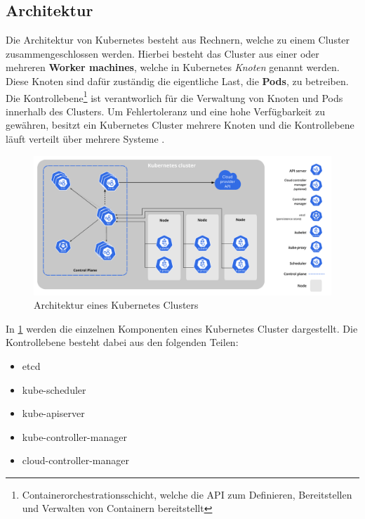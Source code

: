 \subsection{Architektur}
\label{subsec:kubernetes:architecture}
Die Architektur von Kubernetes besteht aus Rechnern, welche zu einem Cluster zusammengeschlossen werden.
Hierbei besteht das Cluster aus einer oder mehreren \textbf{Worker machines}, welche in Kubernetes \emph{Knoten}
genannt werden. Diese Knoten sind dafür zuständig die eigentliche Last, die \textbf{Pods}, zu betreiben.
Die Kontrollebene\footnote{Containerorchestrationsschicht, welche die API zum Definieren, Bereitstellen und Verwalten von Containern bereitstellt}
ist verantworlich für die Verwaltung von Knoten und Pods innerhalb des Clusters. 
Um Fehlertoleranz und eine hohe Verfügbarkeit zu gewähren, besitzt ein Kubernetes Cluster mehrere Knoten und
die Kontrollebene läuft verteilt über mehrere Systeme \cite{kubernetesComponents}. 

\begin{figure}
  \centering
  \includegraphics[width=1.2\textwidth]{gfx/chapters/2_grundlagen/components-of-kubernetes.pdf}
  \caption{Architektur eines Kubernetes Clusters}
  \label{fig:kubernetes_architecture}
\end{figure}

In \ref{fig:kubernetes_architecture} werden die einzelnen Komponenten eines Kubernetes Cluster dargestellt.
Die Kontrollebene besteht dabei aus den folgenden Teilen:
\begin{itemize}
  \item etcd
  \item kube-scheduler
  \item kube-apiserver
  \item kube-controller-manager
  \item cloud-controller-manager
\end{itemize}


